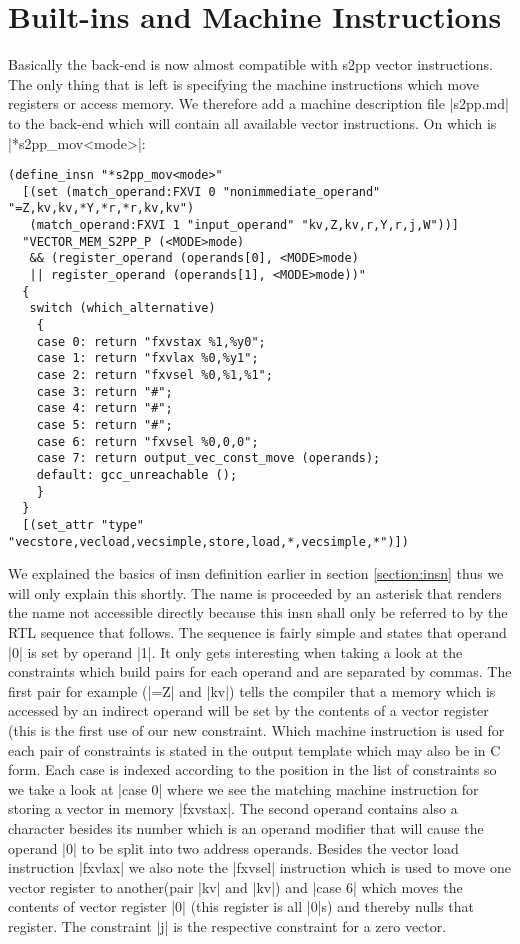 \section{Built-ins and Machine Instructions}
Basically the back-end is now almost compatible with s2pp vector instructions.
The only thing that is left is specifying the machine instructions which move registers or access memory.
We therefore add a machine description file |s2pp.md| to the back-end which will contain all available vector instructions.
On which is |*s2pp_mov<mode>|:
\begin{lstlisting}
(define_insn "*s2pp_mov<mode>"
  [(set (match_operand:FXVI 0 "nonimmediate_operand" "=Z,kv,kv,*Y,*r,*r,kv,kv")
   (match_operand:FXVI 1 "input_operand" "kv,Z,kv,r,Y,r,j,W"))]
  "VECTOR_MEM_S2PP_P (<MODE>mode)
   && (register_operand (operands[0], <MODE>mode) 
   || register_operand (operands[1], <MODE>mode))"
  { 
   switch (which_alternative)
    {
    case 0: return "fxvstax %1,%y0";
    case 1: return "fxvlax %0,%y1";
    case 2: return "fxvsel %0,%1,%1";
    case 3: return "#";
    case 4: return "#";
    case 5: return "#";
    case 6: return "fxvsel %0,0,0";
    case 7: return output_vec_const_move (operands);
    default: gcc_unreachable ();
    }
  } 
  [(set_attr "type" "vecstore,vecload,vecsimple,store,load,*,vecsimple,*")])
\end{lstlisting}

We explained the basics of insn definition earlier in section \ref{section:insn} thus we will only explain this shortly.
The name is proceeded by an asterisk that renders the name not accessible directly because this insn shall only be referred to by the RTL sequence that follows.
The sequence is fairly simple and states that operand |0| is set by operand |1|.
It only gets interesting when taking a look at the constraints which build pairs for each operand and are separated by commas.
The first pair for example (|=Z| and |kv|) tells the compiler that a memory which is accessed by an indirect operand will be set by the contents of a vector register (this is the first use of our new constraint.
Which machine instruction is used for each pair of constraints is stated in the output template which may also be in C form.
Each case is indexed according to the position in the list of constraints so we take a look at |case 0| where we see the matching machine instruction for storing a vector in memory |fxvstax|.
The second operand contains also a character besides its number which is an operand modifier \cite{GCCint:extasm} that will cause the operand |0| to be split into two address operands.
Besides the vector load instruction |fxvlax| we also note the |fxvsel| instruction which is used to move one vector register to another(pair |kv| and |kv|) and |case 6| which moves the contents of vector register |0| (this register is all |0|s) and thereby nulls that register.
The constraint |j| is the respective constraint for a zero vector.

